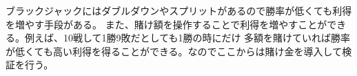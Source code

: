 ブラックジャックにはダブルダウンやスプリットがあるので勝率が低くても利得を増やす手段がある。
また、賭け額を操作することで利得を増やすことができる。例えば、10戦して1勝9敗だとしても1勝の時にだけ
多額を賭けていれば勝率が低くても高い利得を得ることができる。なのでここからは賭け金を導入して検証を行う。
